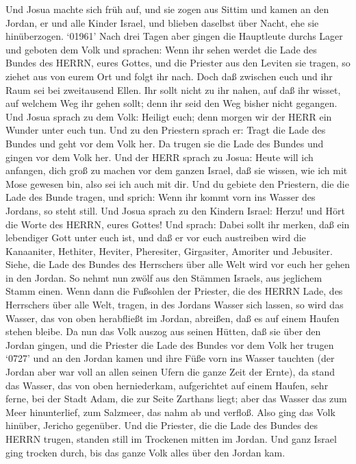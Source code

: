  Und Josua machte sich früh auf, und sie zogen aus Sittim
und kamen an den Jordan, er und alle Kinder Israel, und blieben daselbst
über Nacht, ehe sie hinüberzogen.  `01961' Nach drei Tagen
aber gingen die Hauptleute durchs Lager  und geboten dem
Volk und sprachen: Wenn ihr sehen werdet die Lade des Bundes des HERRN,
eures Gottes, und die Priester aus den Leviten sie tragen, so ziehet aus
von eurem Ort und folgt ihr nach.  Doch daß zwischen euch
und ihr Raum sei bei zweitausend Ellen. Ihr sollt nicht zu ihr nahen,
auf daß ihr wisset, auf welchem Weg ihr gehen sollt; denn ihr seid den
Weg bisher nicht gegangen.  Und Josua sprach zu dem Volk:
Heiligt euch; denn morgen wir der HERR ein Wunder unter euch tun.
 Und zu den Priestern sprach er: Tragt die Lade des Bundes
und geht vor dem Volk her. Da trugen sie die Lade des Bundes und gingen
vor dem Volk her.  Und der HERR sprach zu Josua: Heute will
ich anfangen, dich groß zu machen vor dem ganzen Israel, daß sie wissen,
wie ich mit Mose gewesen bin, also sei ich auch mit dir. 
Und du gebiete den Priestern, die die Lade des Bunde tragen, und sprich:
Wenn ihr kommt vorn ins Wasser des Jordans, so steht still. 
Und Josua sprach zu den Kindern Israel: Herzu! und Hört die Worte des
HERRN, eures Gottes!  Und sprach: Dabei sollt ihr merken,
daß ein lebendiger Gott unter euch ist, und daß er vor euch austreiben
wird die Kanaaniter, Hethiter, Heviter, Pheresiter, Girgasiter, Amoriter
und Jebusiter.  Siehe, die Lade des Bundes des Herrschers
über alle Welt wird vor euch her gehen in den Jordan.  So
nehmt nun zwölf aus den Stämmen Israels, aus jeglichem Stamm einen.
 Wenn dann die Fußsohlen der Priester, die des HERRN Lade,
des Herrschers über alle Welt, tragen, in des Jordans Wasser sich
lassen, so wird das Wasser, das von oben herabfließt im Jordan,
abreißen, daß es auf einem Haufen stehen bleibe.  Da nun
das Volk auszog aus seinen Hütten, daß sie über den Jordan gingen, und
die Priester die Lade des Bundes vor dem Volk her trugen 
`0727' und an den Jordan kamen und ihre Füße vorn ins Wasser tauchten
(der Jordan aber war voll an allen seinen Ufern die ganze Zeit der
Ernte),  da stand das Wasser, das von oben herniederkam,
aufgerichtet auf einem Haufen, sehr ferne, bei der Stadt Adam, die zur
Seite Zarthans liegt; aber das Wasser das zum Meer hinunterlief, zum
Salzmeer, das nahm ab und verfloß. Also ging das Volk hinüber, Jericho
gegenüber.  Und die Priester, die die Lade des Bundes des
HERRN trugen, standen still im Trockenen mitten im Jordan. Und ganz
Israel ging trocken durch, bis das ganze Volk alles über den Jordan kam.

